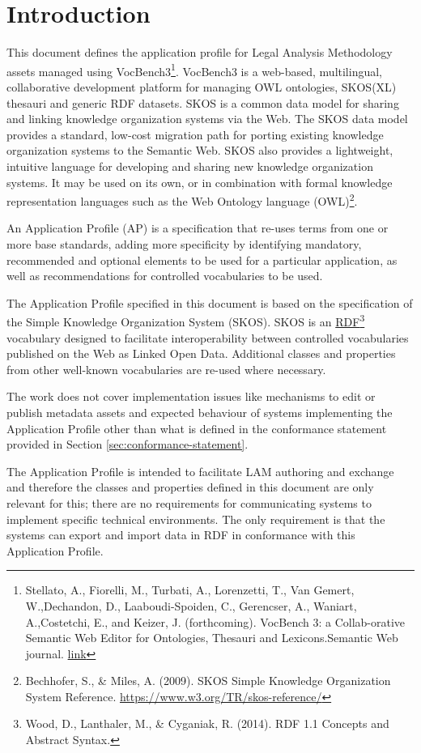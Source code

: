 \section{Introduction}
\label{ariaid-title2}

This document defines the application profile for Legal Analysis
Methodology assets managed using
VocBench3\footnote{Stellato, A., Fiorelli,
	M., Turbati, A., Lorenzetti, T., Van Gemert, W.,Dechandon, D.,
	Laaboudi-Spoiden, C., Gerencser, A., Waniart, A.,Costetchi, E., and
	Keizer, J. (forthcoming). VocBench 3: a Collab-orative Semantic Web
	Editor for Ontologies, Thesauri and Lexicons.Semantic Web journal.
	\href{http://www.semantic-web-journal.net/content/vocbench-3-collaborative-semantic-web-editor-ontologies-thesauri-and-lexicons-1}{link}}. VocBench3 is
a web-based, multilingual, collaborative development platform for
managing OWL ontologies, SKOS(XL) thesauri and generic RDF datasets.
SKOS is a common data model for sharing and linking knowledge
organization systems via the Web. The SKOS data model provides a
standard, low-cost migration path for porting existing knowledge
organization systems to the Semantic Web. SKOS also provides a
lightweight, intuitive language for developing and sharing new knowledge
organization systems. It may be used on its own, or in combination with
formal knowledge representation languages such as the Web Ontology
language (OWL)\footnote{Bechhofer, S., \&
	Miles, A. (2009). SKOS Simple Knowledge Organization System Reference.
	\mbox{\url{https://www.w3.org/TR/skos-reference/}} }.

An Application Profile (AP) is a specification that re-uses terms from
one or more base standards, adding more specificity by identifying
mandatory, recommended and optional elements to be used for a particular
application, as well as recommendations for controlled vocabularies to
be used.

The Application Profile specified in this document is based on the specification of the Simple Knowledge Organization System (SKOS). SKOS is an \href{https://www.w3.org/TR/rdf11-concepts/}{RDF}\footnote{Wood, D., Lanthaler,
	M., \& Cyganiak, R. (2014). RDF 1.1 Concepts and Abstract Syntax.} vocabulary designed to facilitate interoperability between controlled vocabularies published on the Web as Linked Open Data. Additional classes and properties from other well-known vocabularies are re-used where necessary.

The work does not cover implementation issues like mechanisms to edit or publish metadata assets and expected behaviour of systems implementing the Application Profile other than what is defined in the conformance statement provided in Section \ref{sec:conformance-statement}.

The Application Profile is intended to facilitate LAM authoring and exchange and  therefore the classes and properties defined in this document are only relevant for this; there are no requirements for communicating systems to implement specific technical environments. The only requirement is that the systems can export and import data in RDF in conformance with this Application Profile.




